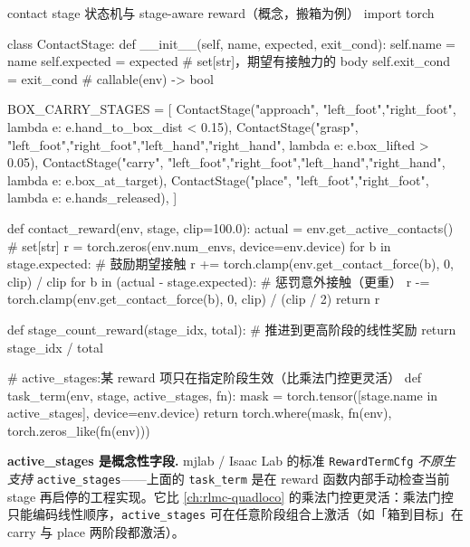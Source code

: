 \begin{codebox}[Python]{contact stage 状态机与 stage-aware reward（概念，搬箱为例）}
import torch

class ContactStage:
    def __init__(self, name, expected, exit_cond):
        self.name = name
        self.expected = expected          # set[str]，期望有接触力的 body
        self.exit_cond = exit_cond        # callable(env) -> bool

BOX_CARRY_STAGES = [
    ContactStage("approach",  {"left_foot","right_foot"},
                 lambda e: e.hand_to_box_dist < 0.15),
    ContactStage("grasp",     {"left_foot","right_foot","left_hand","right_hand"},
                 lambda e: e.box_lifted > 0.05),
    ContactStage("carry",     {"left_foot","right_foot","left_hand","right_hand"},
                 lambda e: e.box_at_target),
    ContactStage("place",     {"left_foot","right_foot"},
                 lambda e: e.hands_released),
]

def contact_reward(env, stage, clip=100.0):
    actual = env.get_active_contacts()            # set[str]
    r = torch.zeros(env.num_envs, device=env.device)
    for b in stage.expected:                       # 鼓励期望接触
        r += torch.clamp(env.get_contact_force(b), 0, clip) / clip
    for b in (actual - stage.expected):            # 惩罚意外接触（更重）
        r -= torch.clamp(env.get_contact_force(b), 0, clip) / (clip / 2)
    return r

def stage_count_reward(stage_idx, total):          # 推进到更高阶段的线性奖励
    return stage_idx / total

# active_stages:某 reward 项只在指定阶段生效（比乘法门控更灵活）
def task_term(env, stage, active_stages, fn):
    mask = torch.tensor([stage.name in active_stages], device=env.device)
    return torch.where(mask, fn(env), torch.zeros_like(fn(env)))
\end{codebox}

\begin{note}
\textbf{active\_stages 是概念性字段.}\;
mjlab / Isaac Lab 的标准 \texttt{RewardTermCfg} \emph{不原生支持} \verb|active_stages|——上面的 \verb|task_term| 是在 reward 函数内部手动检查当前 stage 再启停的工程实现。它比 \cref{ch:rlmc-quadloco} 的乘法门控更灵活：乘法门控只能编码线性顺序，\verb|active_stages| 可在任意阶段组合上激活（如「箱到目标」在 carry 与 place 两阶段都激活）。
\end{note}

